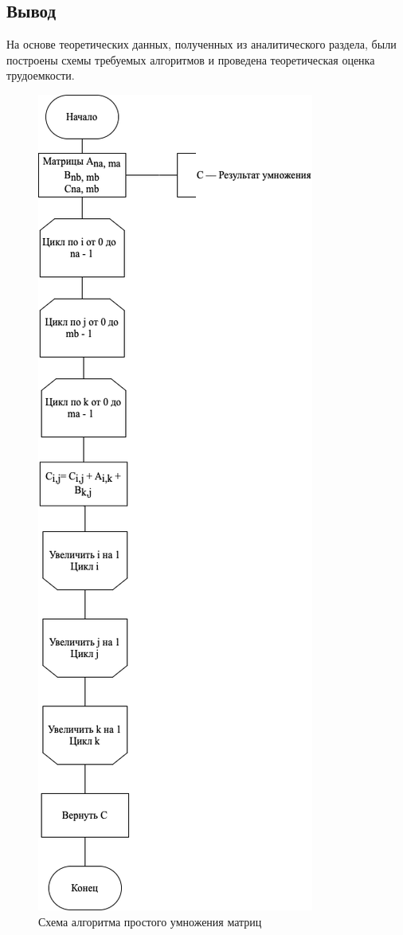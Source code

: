 \subsection{Вывод}

На основе теоретических данных, полученных из аналитического раздела, были построены схемы требуемых алгоритмов и проведена теоретическая оценка трудоемкости.

\begin{figure}
    \centering
    \includegraphics[scale=0.6]{canon.png}
    \caption{Схема алгоритма простого умножения матриц}
    \label{img:canon}
\end{figure}

